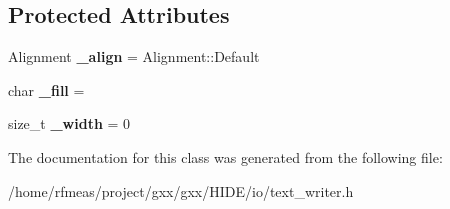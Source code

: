 \subsection*{Protected Attributes}
\begin{DoxyCompactItemize}
\item 
Alignment {\bfseries \+\_\+align} = Alignment\+::\+Default\hypertarget{classgxx_1_1AlignSpec_a0d77546b010f8017183deaf6d6ce5461}{}\label{classgxx_1_1AlignSpec_a0d77546b010f8017183deaf6d6ce5461}

\item 
char {\bfseries \+\_\+fill} = \textquotesingle{} \textquotesingle{}\hypertarget{classgxx_1_1AlignSpec_acf8cdffda2b9f09d89d064502ba5fb84}{}\label{classgxx_1_1AlignSpec_acf8cdffda2b9f09d89d064502ba5fb84}

\item 
size\+\_\+t {\bfseries \+\_\+width} = 0\hypertarget{classgxx_1_1AlignSpec_a139fcb8175b7bd492d6adcf64adccc1b}{}\label{classgxx_1_1AlignSpec_a139fcb8175b7bd492d6adcf64adccc1b}

\end{DoxyCompactItemize}


The documentation for this class was generated from the following file\+:\begin{DoxyCompactItemize}
\item 
/home/rfmeas/project/gxx/gxx/\+H\+I\+D\+E/io/text\+\_\+writer.\+h\end{DoxyCompactItemize}
